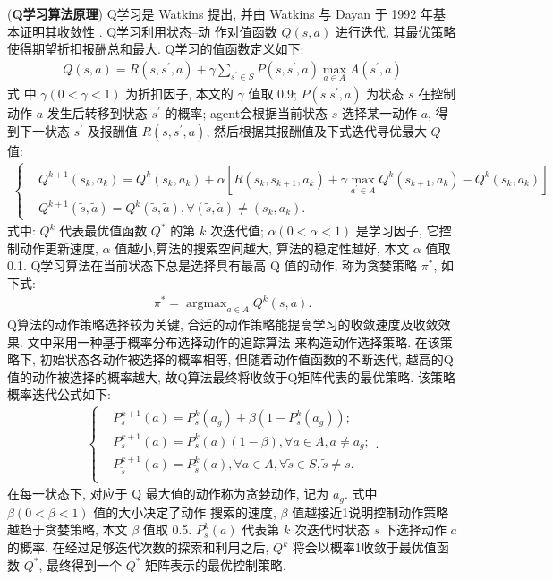 (\textbf{Q学习算法原理}\cite{Yutao2011})
Q学习是 Watkins 提出, 并由 Watkins 与 Dayan 于 1992 年基本证明其收敛性 \cite{watkins1992q}. Q学习利用状态–动
作对值函数 $Q(s,a)$ 进行迭代, 其最优策略使得期望折扣报酬总和最大. Q学习的值函数定义如下:
\begin{eqnarray}
  Q(s,a) =R(s,s^{'}, a) + \gamma\sum_{s^{'}\in S}P(s,s^{'}, a)\max_{a\in A}A(s^{'},a)
\end{eqnarray}
式 中 $\gamma(0 <\gamma< 1)$ 为折扣因子, 本文的 $\gamma$ 值取 0.9;
$P(s|s^{'},a)$ 为状态 $s$ 在控制动作 $a$ 发生后转移到状态 $s^{'}$ 的概率;  agent会根据当前状态 $s$ 选择某一动作 $a$, 得
到下一状态 $s^{'}$ 及报酬值 $R(s,s^{'},a)$, 然后根据其报酬值及下式迭代寻优最大 $Q$ 值:
\begin{eqnarray}
  \left\{\begin{array}{ll}
    &Q^{k+1}(s_k,a_k)=Q^{k}(s_k,a_k)+\alpha[R(s_k,s_{k+1},a_k)+\gamma\max\limits_{a^{'}\in A}Q^{k}(s_{k+1},a_k)-Q^{k}(s_k,a_k)]\\
    &Q^{k+1}(\tilde{s},\tilde{a})=Q^{k}(\tilde{s},\tilde{a}),\forall (\tilde{s},\tilde{a})\neq (s_k,a_k).
  \end{array}\right.
\end{eqnarray}
式中: $Q^k$ 代表最优值函数 $Q^{*}$ 的第 $k$ 次迭代值;  $\alpha(0 <\alpha< 1)$ 是学习因子, 它控制动作更新速度, $\alpha$ 值越小,算法的搜索空间越大, 算法的稳定性越好, 本文 $\alpha$ 值取 0.1. Q学习算法在当前状态下总是选择具有最高 Q 值的动作, 称为贪婪策略 $\pi^{*}$, 如下式:
\begin{eqnarray}
  \pi^{*}=\mathop{\arg\max}_{a\in A}Q^k (s,a).
\end{eqnarray}
Q算法的动作策略选择较为关键, 合适的动作策略能提高学习的收敛速度及收敛效果. 文中采用一种基于概率分布选择动作的追踪算法
\cite{sutton1998reinforcement} 来构造动作选择策略. 在该策略下, 初始状态各动作被选择的概率相等, 但随着动作值函数的不断迭代, 越高的Q值的动作被选择的概率越大, 故Q算法最终将收敛于Q矩阵代表的最优策略.
该策略概率迭代公式如下:
\begin{eqnarray}
  \left\{\begin{array}{ll}
    &P^{k+1}_s(a)=P^k_s(a_g)+\beta(1-P^k_s(a_g));\\
    &P^{k+1}_s(a)=P^k_s(a)(1-\beta),\forall a\in A, a\neq a_g;\\
    &P^{k+1}_{\tilde{s}}(a)=P^k_{\tilde{s}}(a),\forall a\in A, \forall \tilde{s}\in S,\tilde{s}\neq s.\\
  \end{array}\right..
\end{eqnarray}
在每一状态下, 对应于 Q 最大值的动作称为贪婪动作, 记为 $a_g$. 式中 $\beta(0 <\beta < 1)$ 值的大小决定了动作
搜索的速度, $\beta$ 值越接近1说明控制动作策略越趋于贪婪策略, 本文 $\beta$ 值取 0.5. $P^k_s(a)$ 代表第 $k$ 次迭代时状态 $s$ 下选择动作 $a$ 的概率.
在经过足够迭代次数的探索和利用之后, $Q^k$ 将会以概率1收敛于最优值函数 $Q^{*}$, 最终得到一个 $Q^{*}$ 矩阵表示的最优控制策略.

